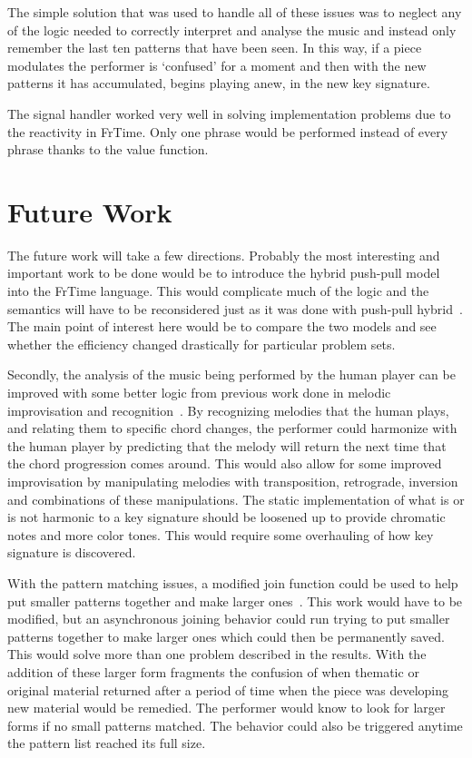 \documentclass[12pt]{ucthesis}
\begin{document}
The simple solution that was used to handle all of these issues was to neglect any of the logic needed to correctly interpret and analyse the music and instead only remember the last ten patterns that have been seen. In this way, if a piece modulates the performer is `confused' for a moment and then with the new patterns it has accumulated, begins playing anew, in the new key signature. 

The signal handler worked very well in solving implementation problems due to the reactivity in FrTime. Only one phrase would be performed instead of every phrase thanks to the value function.

\chapter{Future Work}
\label{future}

The future work will take a few directions. Probably the most interesting and important work to be done would be to introduce the hybrid push-pull model into the FrTime language. This would complicate much of the logic and the semantics will have to be reconsidered just as it was done with push-pull hybrid~\cite{push-pull-frp}. The main point of interest here would be to compare the two models and see whether the efficiency changed drastically for particular problem sets. 

Secondly, the analysis of the music being performed by the human player can be improved with some better logic from previous work done in melodic improvisation and recognition~\cite{MelodicRecognition}. By recognizing melodies that the human plays, and relating them to specific chord changes, the performer could harmonize with the human player by predicting that the melody will return the next time that the chord progression comes around. This would also allow for some improved improvisation by manipulating melodies with transposition, retrograde, inversion and combinations of these manipulations. The static implementation of what is or is not harmonic to a key signature should be loosened up to provide chromatic notes and more color tones. This would require some overhauling of how key signature is discovered. 

With the pattern matching issues, a modified join function could be used to help put smaller patterns together and make larger ones~\cite{slidingWindow}. This work would have to be modified, but an asynchronous joining behavior could run trying to put smaller patterns together to make larger ones which could then be permanently saved. This would solve more than one problem described in the results. With the addition of these larger form fragments the confusion of when thematic or original material returned after a period of time when the piece was developing new material would be remedied. The performer would know to look for larger forms if no small patterns matched. The behavior could also be triggered anytime the pattern list reached its full size. 
\end{document}
